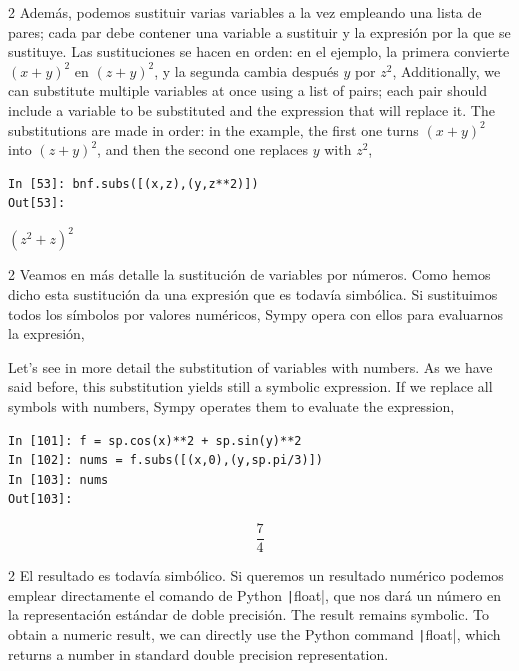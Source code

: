 \begin{paracol}{2}
Además, podemos sustituir varias variables a la vez empleando una lista de pares; cada par debe contener una variable a sustituir y la expresión por la que se sustituye. Las sustituciones se hacen en orden: en el ejemplo, la primera convierte $(x+y)^2$ en $(z+y)^2$, y la segunda cambia después $y$ por $z^2$,
\switchcolumn
Additionally, we can substitute multiple variables at once using a list of pairs; each pair should include a variable to be substituted and the expression that will replace it. The substitutions are made in order: in the example, the first one turns $(x+y)^2$ into $(z+y)^2$, and then the second one replaces $y$ with $z^2$,

\end{paracol}
\begin{center}
	\begin{minipage}{.25\textwidth}
		\begin{verbatim}
In [53]: bnf.subs([(x,z),(y,z**2)])
Out[53]:
		\end{verbatim}
		$(z^2+z)^2$
	\end{minipage}
\end{center}
\begin{paracol}{2}
Veamos en más detalle la sustitución de variables por números. Como hemos dicho esta sustitución da una expresión que es todavía simbólica. Si sustituimos todos los símbolos por valores numéricos, Sympy opera con ellos para evaluarnos la expresión,

\switchcolumn
Let's see in more detail the substitution of variables with numbers. As we have said before, this substitution yields still a symbolic expression. If we replace all symbols with numbers, Sympy operates them to evaluate the expression,
\end{paracol}
\begin{center}
	\begin{minipage}{.5\textwidth}
		\begin{verbatim}
In [101]: f = sp.cos(x)**2 + sp.sin(y)**2
In [102]: nums = f.subs([(x,0),(y,sp.pi/3)])
In [103]: nums
Out[103]:
		\end{verbatim}
		\begin{equation*} \frac{7}{4}\end{equation*}
	\end{minipage}
\end{center}
\begin{paracol}{2}
El resultado es todavía simbólico. Si queremos un resultado numérico podemos emplear directamente el comando de Python \texttt|float|, que nos dará un número en la representación estándar de doble precisión.
\switchcolumn
The result remains symbolic. To obtain a numeric result, we can directly use the Python command \texttt|float|, which returns a number in standard double precision representation.
\end{paracol}
